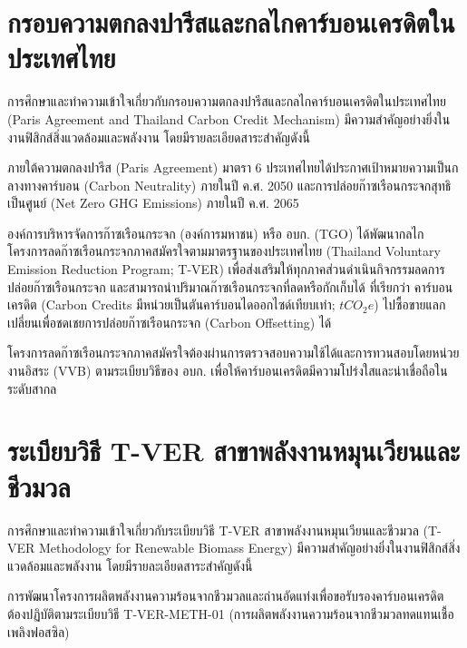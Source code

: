 
\section{กรอบความตกลงปารีสและกลไกคาร์บอนเครดิตในประเทศไทย}

การศึกษาและทำความเข้าใจเกี่ยวกับกรอบความตกลงปารีสและกลไกคาร์บอนเครดิตในประเทศไทย (Paris Agreement and Thailand Carbon Credit Mechanism) มีความสำคัญอย่างยิ่งในงานฟิสิกส์สิ่งแวดล้อมและพลังงาน โดยมีรายละเอียดสาระสำคัญดังนี้

ภายใต้ความตกลงปารีส (Paris Agreement) มาตรา 6 ประเทศไทยได้ประกาศเป้าหมายความเป็นกลางทางคาร์บอน (Carbon Neutrality) ภายในปี ค.ศ. 2050 และการปล่อยก๊าซเรือนกระจกสุทธิเป็นศูนย์ (Net Zero GHG Emissions) ภายในปี ค.ศ. 2065

องค์การบริหารจัดการก๊าซเรือนกระจก (องค์การมหาชน) หรือ อบก. (TGO) ได้พัฒนากลไก โครงการลดก๊าซเรือนกระจกภาคสมัครใจตามมาตรฐานของประเทศไทย (Thailand Voluntary Emission Reduction Program; T-VER) เพื่อส่งเสริมให้ทุกภาคส่วนดำเนินกิจกรรมลดการปล่อยก๊าซเรือนกระจก และสามารถนำปริมาณก๊าซเรือนกระจกที่ลดหรือกักเก็บได้ ที่เรียกว่า คาร์บอนเครดิต (Carbon Credits มีหน่วยเป็นตันคาร์บอนไดออกไซด์เทียบเท่า; $tCO_2e$) ไปซื้อขายแลกเปลี่ยนเพื่อชดเชยการปล่อยก๊าซเรือนกระจก (Carbon Offsetting) ได้

\begin{casebox}
โครงการลดก๊าซเรือนกระจกภาคสมัครใจต้องผ่านการตรวจสอบความใช้ได้และการทวนสอบโดยหน่วยงานอิสระ (VVB) ตามระเบียบวิธีของ อบก. เพื่อให้คาร์บอนเครดิตมีความโปร่งใสและน่าเชื่อถือในระดับสากล
\end{casebox}

\section{ระเบียบวิธี T-VER สาขาพลังงานหมุนเวียนและชีวมวล}

การศึกษาและทำความเข้าใจเกี่ยวกับระเบียบวิธี T-VER สาขาพลังงานหมุนเวียนและชีวมวล (T-VER Methodology for Renewable Biomass Energy) มีความสำคัญอย่างยิ่งในงานฟิสิกส์สิ่งแวดล้อมและพลังงาน โดยมีรายละเอียดสาระสำคัญดังนี้

การพัฒนาโครงการผลิตพลังงานความร้อนจากชีวมวลและถ่านอัดแท่งเพื่อขอรับรองคาร์บอนเครดิต ต้องปฏิบัติตามระเบียบวิธี T-VER-METH-01 (การผลิตพลังงานความร้อนจากชีวมวลทดแทนเชื้อเพลิงฟอสซิล)

